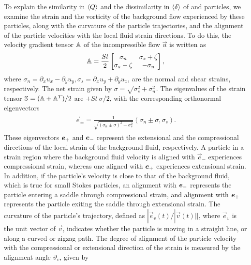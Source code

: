 \documentclass[../Rajarshi-thesis-draft.tex]{subfiles}
\begin{document}
To explain the similarity in $\langle Q\rangle$ and the dissimilarity in $\langle \delta\rangle$ of \cs and \su particles, we examine the strain and the vorticity of the background flow experienced by these particles, along with the curvature of the particle trajectories, and the alignment of the particle velocities with the local fluid strain directions. To do this, the velocity gradient tensor $\mathbb{A}$ of the incompressible flow $\vec{u}$ is written as
\begin{align}
\begin{split}
    \mathbb{A} = \frac{St}{2}
    \begin{bmatrix}
      \sigma_n & \sigma_s + \zeta \\
      \sigma_s - \zeta & -\sigma_n
    \end{bmatrix},
\end{split}
\end{align}
where $\sigma_n = \partial_x u_x - \partial_y u_y, \sigma_s = \partial_x u_y + \partial_y u_x$, are the  normal and shear strains, respectively. The net strain given by $\sigma = \sqrt{\sigma_s^2 + \sigma_n^2}$. The eigenvalues of the strain tensor $\mathbb{S} = (\mathbb{A} + \mathbb{A}^T)/ 2$ are $\pm St~\sigma/2$, with the corresponding orthonormal eigenvectors
\begin{align}
\label{int-epm}
\begin{split}
    \vec{e}_\pm = \frac{1}{\sqrt{(\sigma_n \pm \sigma)^2 + \sigma_s^2}}\left(\sigma_n \pm \sigma, \sigma_s\right).
\end{split}
\end{align}
These eigenvectors $\boldsymbol{e}_+$ and $\boldsymbol{e}_{-}$ represent the extensional and the compressional directions of the local strain of the background fluid, respectively. A particle in a strain region where the background fluid velocity is aligned with $\vec{e}_-$ experiences  compressional strain, whereas one aligned with $\boldsymbol{e}_+$ experiences extensional strain. In addition, if the particle's velocity is close to that of the background fluid, which is true for small Stokes particles, an alignment with $\boldsymbol{e}_{-}$ represents the particle entering a saddle through compressional strain, and alignment with $\boldsymbol{e}_+$ represents the particle exiting the saddle through extensional strain. The curvature of the particle's trajectory, defined as $|\dot{\vec{e}}_v(t)/|\vec{v}(t)||$, where $\vec{e}_v$ is the unit vector of $\vec{v}$, indicates whether the particle is moving in a straight line, or along a curved or zigzag path. The degree of alignment of the particle velocity with the compressional or extensional direction of the strain is measured by the alignment angle $\vartheta_v$, given by
\end{document}
